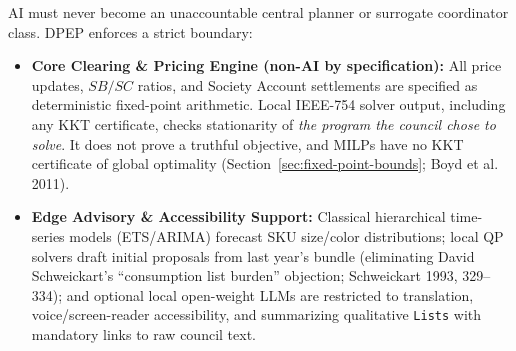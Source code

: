 \documentclass[10pt,twoside,openany]{book}
\theoremstyle{dpepstyle}
\begin{document}
AI must never become an unaccountable central planner or surrogate coordinator class. DPEP enforces a strict boundary:
\begin{itemize}[leftmargin=1.6em,itemsep=2pt]
  \item \textbf{Core Clearing \& Pricing Engine (non-AI by specification):} All price updates, $SB/SC$ ratios, and Society Account settlements are specified as deterministic fixed-point arithmetic. Local IEEE-754 solver output, including any KKT certificate, checks stationarity of \emph{the program the council chose to solve}. It does not prove a truthful objective, and MILPs have no KKT certificate of global optimality (Section~\ref{sec:fixed-point-bounds}; Boyd et al. 2011).
  \item \textbf{Edge Advisory \& Accessibility Support:} Classical hierarchical time-series models (ETS/ARIMA) forecast SKU size/color distributions; local QP solvers draft initial proposals from last year's bundle (eliminating David Schweickart's ``consumption list burden'' objection; Schweickart 1993, 329--334); and optional local open-weight LLMs are restricted to translation, voice/screen-reader accessibility, and summarizing qualitative \texttt{Lists} with mandatory links to raw council text.
\end{itemize}
\end{document}
